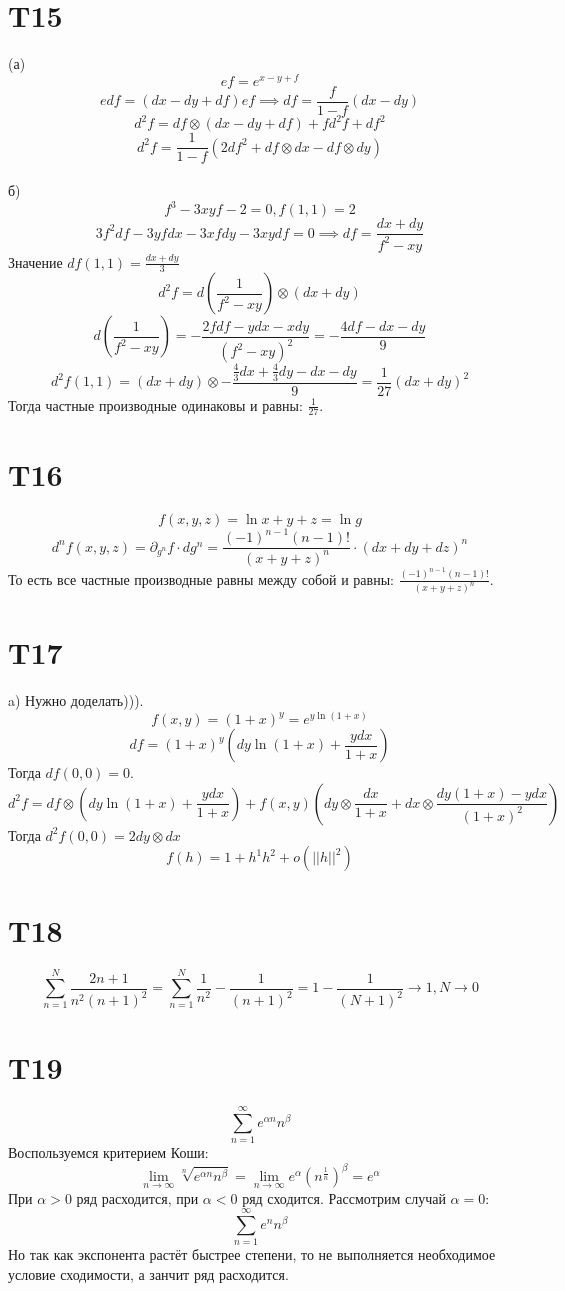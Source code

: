 \documentclass[12pt]{article}
\begin{document}
\section{T15}
(а)
\[
    ef = e^{x - y + f}
\]
\[
    e df = (dx - dy + df) ef \implies df = \frac{f}{1 - f}(dx - dy) 
\]
\[
    d^2f = df \otimes (dx - dy + df) + f d^2 f + df^2
\]
\[
    d^2 f = \frac{1}{1 - f}(2df^2 + df \otimes dx - df \otimes dy)
\]
\\
б)
\[
    f^3 - 3xyf - 2 = 0, f(1, 1) = 2
\]
\[
    3f^2 df - 3yf dx - 3xf dy - 3xy df = 0 \implies df = \frac{dx + dy}{f^2 - xy}
\]
Значение \(df(1, 1) = \frac{dx + dy}{3}\) 
\[
    d^2 f = d \left( \frac{1}{f^2 - xy} \right) \otimes (dx + dy) 
\]
\[
    d \left( \frac{1}{f^2 - xy} \right) = -\frac{2f df - ydx - x dy}{(f^2 - xy)^2} = -\frac{4df - dx - dy}{9}
\]
\[
    d^2 f(1, 1) = (dx + dy) \otimes -\frac{\frac{4}{3}dx + \frac{4}{3}dy - dx - dy}{9} = \frac{1}{27}(dx + dy)^2 
\]
Тогда частные производные одинаковы и равны: \(\frac{1}{27}\). 
\section{T16}
\[
    f(x, y, z) = \ln{x + y + z} = \ln g
\]
\[
    d^n f(x, y, z) = \partial_{g^n} f \cdot dg^n = \frac{(-1)^{n - 1} (n - 1)!}{(x + y + z)^n} \cdot (dx + dy + dz)^n
\]
То есть все частные производные равны между собой и равны: \(\frac{(-1)^{n - 1} (n - 1)!}{(x + y + z)^n}\). 
\section{T17}
a) 
Нужно доделать))).
\[
    f(x, y) = (1 + x)^y = e^{y\ln (1 + x)} 
\]
\[
    df = (1 + x)^y (dy\ln(1 + x) + \frac{ydx}{1 + x})
\]
Тогда $df(0, 0) = 0$.
\[
    d^2 f = df \otimes (dy\ln(1 + x) + \frac{ydx}{1 + x}) + f(x, y) (dy \otimes \frac{dx}{1 + x} + dx \otimes \frac{dy(1 + x) - ydx}{(1 + x)^2})
\]
Тогда $d^2 f(0, 0) = 2 dy \otimes dx$ 
\[
    f(h) = 1 + h^1 h^2 + o(||h||^2)
\]
\section{T18}
\[
    \sum_{n=1}^{N} \frac{2n + 1}{n^2(n+1)^2} = \sum_{n=1}^{N} \frac{1}{n^2} - \frac{1}{(n+1)^2} = 
    1 - \frac{1}{(N+1)^2} \to 1, N \to 0 
\]
\section{T19}
\[
    \sum_{n=1}^{\infty} e^{\alpha n}n^\beta 
\]
Воспользуемся критерием Коши:
\[
    \lim_{n \to \infty} \sqrt[n]{e^{\alpha n}n^\beta} = 
    \lim_{n \to \infty} e^\alpha (n^{\frac{1}{n}})^\beta = 
    e^\alpha 
\]
При $\alpha > 0$ ряд расходится, при $\alpha < 0$ ряд сходится. Рассмотрим случай $\alpha = 0$:
\[
    \sum_{n=1}^{\infty} e^n n^\beta 
\]
Но так как экспонента растёт быстрее степени, то не выполняется необходимое условие сходимости, а занчит ряд расходится. 
\end{document}

